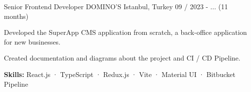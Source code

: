

\begin{cventries}

\cventry
  {Senior Frontend Developer} %
  {DOMINO'S} %
  {Istanbul, Turkey} %
  {09 / 2023 - ... (11 months)}
  {
    \begin{cvitems} %
      \item {Developed the SuperApp CMS application from scratch, a back-office application for new businesses.}
      \item {Created documentation and diagrams about the project and CI / CD Pipeline.}
      \item {\textbf {Skills:} React.js · TypeScript · Redux.js · Vite · Material UI · Bitbucket Pipeline}
    \end{cvitems}
  }


\end{cventries}
